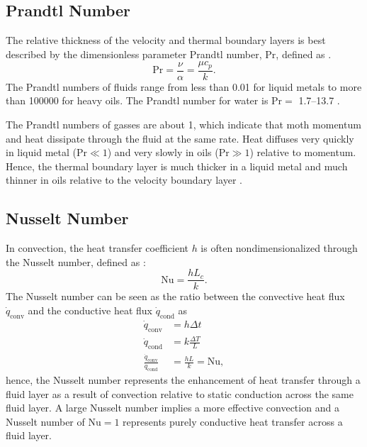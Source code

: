 \subsection{Prandtl Number}
The relative thickness of the velocity and thermal boundary layers is best described by the dimensionless parameter Prandtl number, $\mathrm{Pr}$, defined as .
\begin{equation*}
  \mathrm{Pr} = \frac{\nu}{\alpha} = \frac{\mu c_p}{k}
.\end{equation*}
The Prandtl numbers of fluids range from less than \num{0,01} for liquid metals to more than \num{100000} for heavy oils.
The Prandtl number for water is $\mathrm{Pr} =$ \numrange{1,7}{13,7} .

The Prandtl numbers of gasses are about 1, which indicate that moth momentum and heat dissipate through the fluid at the same rate.
Heat diffuses very quickly in liquid metal ($\mathrm{Pr} \ll 1$) and very slowly in oils ($\mathrm{Pr} \gg 1$) relative to momentum.
Hence, the thermal boundary layer is much thicker in a liquid metal and much thinner in oils relative to the velocity boundary layer .

\subsection{Nusselt Number}
In convection, the heat transfer coefficient $h$ is often nondimensionalized through the Nusselt number, defined as :
\begin{equation*}
  \mathrm{Nu} = \frac{h L_c}{k}
.\end{equation*}
The Nusselt number can be seen as the ratio between the convective heat flux $\dot{q}_{\mathrm{conv}}$ and the conductive heat flux $\dot{q}_{\mathrm{cond}}$ as 
\begin{align*}
  \dot{q}_{\mathrm{conv}} &= h \Delta t \\
  \dot{q}_{\mathrm{cond}} &= k \frac{\Delta T}{L} \\
  \frac{\dot{q}_{\mathrm{conv}}}{\dot{q}_{\mathrm{cond}}} &= \frac{h L}{k} = \mathrm{Nu}
,\end{align*}
hence, the Nusselt number represents the enhancement of heat transfer through a fluid layer as a result of convection relative to static conduction across the same fluid layer.
A large Nusselt number implies a more effective convection and a Nusselt number of $\mathrm{Nu} = 1$ represents purely conductive heat transfer across a fluid layer.

